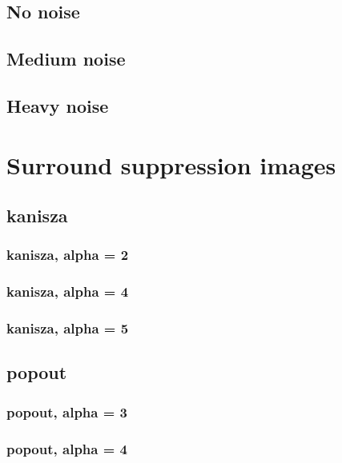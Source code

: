 \documentclass[10pt,a4paper]{article}
\begin{document}
\subsection{No noise}

\subsection{Medium noise}

\subsection{Heavy noise}


\section{Surround suppression images}
\subsection{kanisza}

\subsubsection{kanisza, alpha = 2}

\subsubsection{kanisza, alpha = 4}

\subsubsection{kanisza, alpha = 5}


\subsection{popout}

\subsubsection{popout, alpha = 3}

\subsubsection{popout, alpha = 4}

\end{document}
